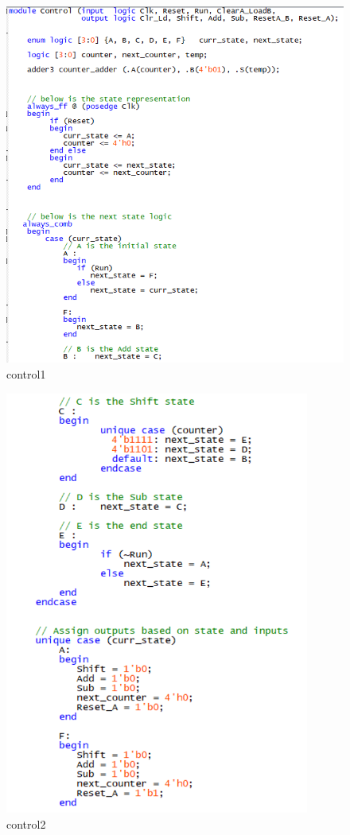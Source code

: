 \documentclass[12pt]{article}
\begin{document}
\begin{figure}[H]
    \centering
    \includegraphics[width=15cm]{control1.png}
    \caption{control1}
\end{figure}
\begin{figure}[H]
    \centering
    \includegraphics[width=10cm]{control2.png}
    \caption{control2}
\end{figure}
\end{document}
